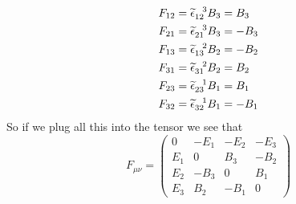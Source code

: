 \documentclass[11pt]{article}
\numberwithin{equation}{section}
\begin{document}
\begin{enumerate}[(a)]
\begin{align*}
F_{12} &= \widetilde{\epsilon}_{12}^{\ \ 3}B_3 = B_3\\
F_{21} &= \widetilde{\epsilon}_{21}^{\ \ 3}B_3 = -B_3\\
F_{13} &= \widetilde{\epsilon}_{13}^{\ \ 2}B_2 = -B_2\\
F_{31} &= \widetilde{\epsilon}_{31}^{\ \ 2}B_2 = B_2\\
F_{23} &= \widetilde{\epsilon}_{23}^{\ \ 1}B_1 = B_1\\
F_{32} &= \widetilde{\epsilon}_{32}^{\ \ 1}B_1 = -B_1
\end{align*}
So if we plug all this into the tensor we see that
$$F_{\mu\nu} = \left(\begin{array}{cccc}
		0 &-E_1 &-E_2 &-E_3\\
		E_1 &0 &B_3 &-B_2\\
		E_2 &-B_3 &0 &B_1\\
		E_3 &B_2 &-B_1 &0
		\end{array}\right)$$


\end{enumerate}
\end{document}
